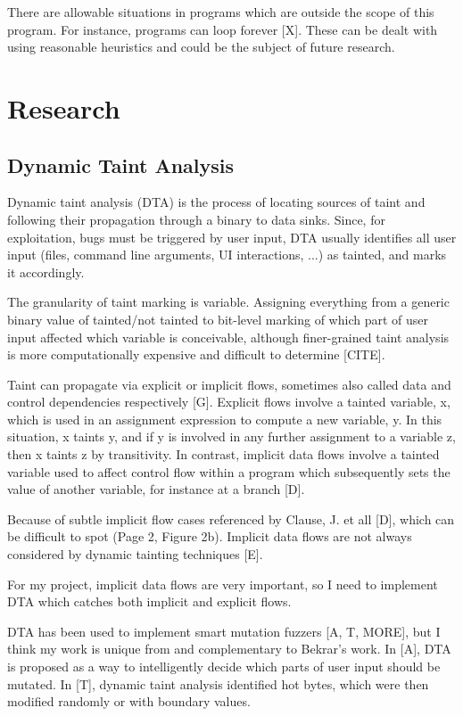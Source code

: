 \documentclass[10pt, twocolumn, times, nocopyrightspace, preprint]{sigplanconf}
\begin{document}
There are allowable situations in programs which are outside the scope of this program. For instance, programs can loop forever [X]. These can be dealt with using reasonable heuristics and could be the subject of future research.

\section{Research}

\subsection{Dynamic Taint Analysis}

Dynamic taint analysis (DTA) is the process of locating sources of taint and following their propagation through a binary to data sinks. Since, for exploitation, bugs must be triggered by user input, DTA usually identifies all user input (files, command line arguments, UI interactions, ...) as tainted, and marks it accordingly.

The granularity of taint marking is variable. Assigning everything from a generic binary value of tainted/not tainted to bit-level marking of which part of user input affected which variable is conceivable, although finer-grained taint analysis is more computationally expensive and difficult to determine [CITE]. 

Taint can propagate via explicit or implicit flows, sometimes also called data and control dependencies respectively [G]. Explicit flows involve a tainted variable, x, which is used in an assignment expression to compute a new variable, y. In this situation, x taints y, and if y is involved in any further assignment to a variable z, then x taints z by transitivity. In contrast, implicit data flows involve a tainted variable used to affect control flow within a program which subsequently sets the value of another variable, for instance at a branch [D]. 

Because of subtle implicit flow cases referenced by Clause, J. et all [D], which can be difficult to spot (Page 2, Figure 2b). Implicit data flows are not always considered by dynamic tainting techniques [E]. 

For my project, implicit data flows are very important, so I need to implement DTA which catches both implicit and explicit flows.

DTA has been used to implement smart mutation fuzzers [A, T, MORE], but I think my work is unique from and complementary to Bekrar's work. In [A], DTA is proposed as a way to intelligently decide which parts of user input should be mutated. In [T], dynamic taint analysis identified hot bytes, which were then modified randomly or with boundary values.
\end{document}
